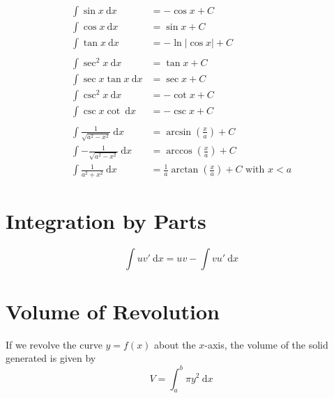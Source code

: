 \documentclass[11pt]{article}
\newcommand{\dx}{\mathrm{~d}x}
\begin{document}
\begin{large}
  \addtolength{\jot}{1em}
  \begin{align*}
    \int \sin x \dx                      & = -\cos x + C                                                         \\
    \int \cos x \dx                      & = \sin x + C                                                          \\
    \int \tan x \dx                      & = -\ln |\cos x| + C                                                   \\ \\
    \int \sec^2 x \dx                    & = \tan x + C                                                          \\
    \int \sec x \tan x \dx               & = \sec x + C                                                          \\
    \int \csc^2 x \dx                    & = -\cot x + C                                                         \\
    \int \csc x \cot \dx                 & = -\csc x   + C                                                       \\ \\
    \int \frac{1}{\sqrt{a^2 - x^2}} \dx  & = \arcsin \left(\frac{x}{a}\right) + C                                \\
    \int -\frac{1}{\sqrt{a^2 - x^2}} \dx & = \arccos \left(\frac{x}{a}\right) + C                                \\
    \int \frac{1}{a^2 + x^2} \dx         & = \frac{1}{a} \arctan \left(\frac{x}{a}\right) + C \text{ with }x < a
  \end{align*}
\end{large}

\pagebreak
\section{Integration by Parts}
$$\int uv' \dx = uv - \int vu' \dx$$
\pagebreak

\section{Volume of Revolution}

If we revolve the curve $y = f(x)$ about the $x$-axis, the volume of the solid generated is given by $$V = \int_{a}^{b} \pi y^2 \dx$$
\end{document}
